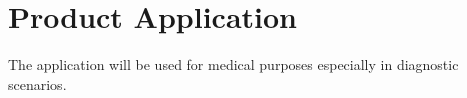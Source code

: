 \section{Product Application}
The application will be used for medical purposes especially in diagnostic scenarios. 